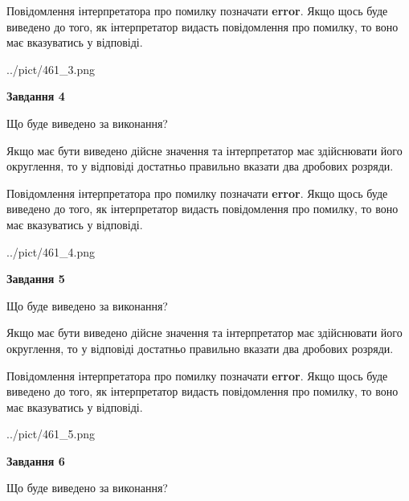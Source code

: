 \documentclass[12pt, ukrainian]{article}
\begin{document}
{\begin {Large}
Повідомлення інтерпретатора про помилку позначати \textbf{error}.
Якщо щось буде виведено до того, як інтерпретатор видасть повідомлення про помилку, 
то воно має вказуватись у відповіді. \par

\begin{center}
	{../pict/461_3.png}
\end{center}
\newpage

{\begin {center}\textbf{Завдання 4}\end {center}}\par
Що буде виведено за виконання? \par

Якщо має бути виведено дійсне значення та інтерпретатор має здійснювати його округлення, 
то у відповіді достатньо правильно вказати два дробових розряди.

Повідомлення інтерпретатора про помилку позначати \textbf{error}.
Якщо щось буде виведено до того, як інтерпретатор видасть повідомлення про помилку, 
то воно має вказуватись у відповіді. \par

\begin{center}
	{../pict/461_4.png}
\end{center}
\newpage

{\begin {center}\textbf{Завдання 5}\end {center}}\par
Що буде виведено за виконання? \par

Якщо має бути виведено дійсне значення та інтерпретатор має здійснювати його округлення, 
то у відповіді достатньо правильно вказати два дробових розряди.

Повідомлення інтерпретатора про помилку позначати \textbf{error}.
Якщо щось буде виведено до того, як інтерпретатор видасть повідомлення про помилку, 
то воно має вказуватись у відповіді. \par

\begin{center}
	{../pict/461_5.png}
\end{center}
\newpage

{\begin {center}\textbf{Завдання 6}\end {center}}\par
Що буде виведено за виконання? \par


\end{Large}}
\end{document}
